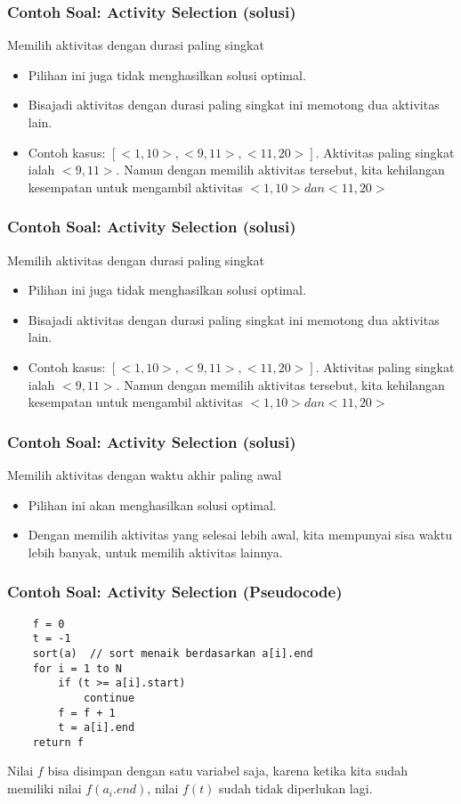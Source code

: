 \begin{frame}
	\frametitle{Contoh Soal: Activity Selection (solusi)}
	Memilih aktivitas dengan durasi paling singkat
	\begin{itemize}
		\item Pilihan ini juga tidak menghasilkan solusi optimal.
		\item Bisajadi aktivitas dengan durasi paling singkat ini memotong dua aktivitas lain.
		\item Contoh kasus: $[ <1,10>, <9, 11> , <11, 20> ]$. Aktivitas paling singkat ialah $<9, 11>$. Namun dengan memilih aktivitas tersebut, kita kehilangan kesempatan untuk mengambil aktivitas $<1, 10> dan <11, 20> $
	\end{itemize}
\end{frame}

\begin{frame}
	\frametitle{Contoh Soal: Activity Selection (solusi)}
	Memilih aktivitas dengan durasi paling singkat
	\begin{itemize}
		\item Pilihan ini juga tidak menghasilkan solusi optimal.
		\item Bisajadi aktivitas dengan durasi paling singkat ini memotong dua aktivitas lain.
		\item Contoh kasus: $[ <1,10>, <9, 11> , <11, 20> ]$. Aktivitas paling singkat ialah $<9, 11>$. Namun dengan memilih aktivitas tersebut, kita kehilangan kesempatan untuk mengambil aktivitas $<1, 10> dan <11, 20> $
	\end{itemize}
\end{frame}

\begin{frame}
	\frametitle{Contoh Soal: Activity Selection (solusi)}
	Memilih aktivitas dengan waktu akhir paling awal
	\begin{itemize}
		\item Pilihan ini akan menghasilkan solusi optimal.
		\item Dengan memilih aktivitas yang selesai lebih awal, kita mempunyai sisa waktu lebih banyak, untuk memilih aktivitas lainnya.
	\end{itemize}
\end{frame}

\begin{frame} [fragile]
	\frametitle{Contoh Soal: Activity Selection (Pseudocode)}
	\begin{lstlisting}
	f = 0
	t = -1
	sort(a)  // sort menaik berdasarkan a[i].end
	for i = 1 to N
		if (t >= a[i].start)
			continue
		f = f + 1
		t = a[i].end
	return f
	\end{lstlisting}
	Nilai $f$ bisa disimpan dengan satu variabel saja, karena ketika kita sudah memiliki nilai $f(a_i.end)$, nilai $f(t)$ sudah tidak diperlukan lagi.
\end{frame}


